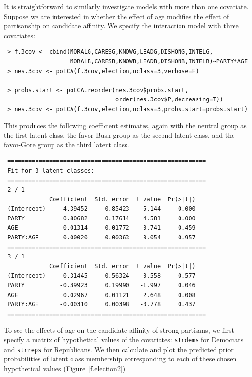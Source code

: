\documentclass[letterpaper,12pt]{article}
\begin{document}
It is straightforward to similarly investigate models with more than one covariate.  Suppose we are interested in whether the effect of age modifies the effect of partisanship on candidate affinity.  We specify the interaction model with three covariates:
\begin{verbatim}
 > f.3cov <- cbind(MORALG,CARESG,KNOWG,LEADG,DISHONG,INTELG,
                   MORALB,CARESB,KNOWB,LEADB,DISHONB,INTELB)~PARTY*AGE
 > nes.3cov <- poLCA(f.3cov,election,nclass=3,verbose=F)

 > probs.start <- poLCA.reorder(nes.3cov$probs.start,
                                order(nes.3cov$P,decreasing=T))
 > nes.3cov <- poLCA(f.3cov,election,nclass=3,probs.start=probs.start)
\end{verbatim}
This produces the following coefficient estimates, again with the neutral group as the first latent class, the favor-Bush group as the second latent class, and the favor-Gore group as the third latent class.

\begin{verbatim}
 =========================================================
 Fit for 3 latent classes:
 =========================================================
 2 / 1
             Coefficient  Std. error  t value  Pr(>|t|)
 (Intercept)    -4.39452     0.85423   -5.144     0.000
 PARTY           0.80682     0.17614    4.581     0.000
 AGE             0.01314     0.01772    0.741     0.459
 PARTY:AGE      -0.00020     0.00363   -0.054     0.957
 =========================================================
 3 / 1
             Coefficient  Std. error  t value  Pr(>|t|)
 (Intercept)    -0.31445     0.56324   -0.558     0.577
 PARTY          -0.39923     0.19990   -1.997     0.046
 AGE             0.02967     0.01121    2.648     0.008
 PARTY:AGE      -0.00310     0.00398   -0.778     0.437
 =========================================================
\end{verbatim}

To see the effects of age on the candidate affinity of strong partisans, we first specify a matrix of hypothetical values of the covariates: \texttt{strdems} for Democrats and \texttt{strreps} for Republicans.  We then calculate and plot the predicted prior probabilities of latent class membership corresponding to each of these chosen hypothetical values (Figure~\ref{f.election2}).
\end{document}

